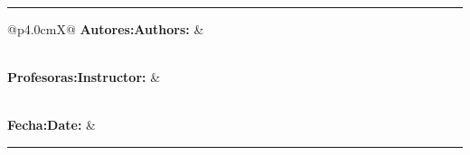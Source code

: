 \newcommand{\maketeampage}{%
  \thispagestyle{empty}

  \vspace*{8mm}

  \noindent
  {\bfseries\Large \titlee\par}

  \vspace{2mm}
  {\normalsize \subject\ \textbullet\ \doctype\ \docid\par}

  \vspace{10mm}
  \noindent\rule{\textwidth}{0.6pt}

  \vspace{10mm}

  \noindent
  {\setlength{\tabcolsep}{0pt}%
  \renewcommand{\arraystretch}{1.55}%
  \begin{tabularx}{\textwidth}{@{}p{4.0cm}X@{}}
  {\bfseries \ifES Autores:\else Authors:\fi} &
  \parbox[t]{\linewidth}{\authors\vspace{0.55cm}} \\

  {\bfseries \ifES Profesoras:\else Instructor:\fi} &
  \parbox[t]{\linewidth}{\teacher} \\[0.75cm]

  {\bfseries \ifES Fecha:\else Date:\fi} &
  \parbox[t]{\linewidth}{\placedate}
  \end{tabularx}}

  \vfill

  \noindent\rule{\textwidth}{0.6pt}

  \newpage
}







\hypersetup{pageanchor=false}

\makecover
\maketeampage

\hypersetup{pageanchor=true}
\setcounter{page}{1}
\pagestyle{fancy}


\ifES
  
\else
  
\fi

\newpage


